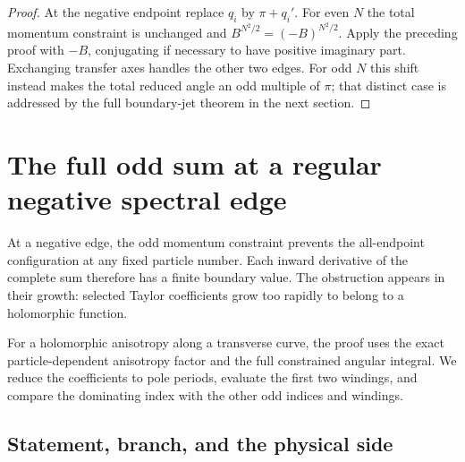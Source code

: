 \documentclass[11pt]{article}
\numberwithin{equation}{section}
\theoremstyle{definition}
\begin{document}
\begin{proof}
At the negative endpoint replace \(q_i\) by \(\pi+q_i'\).
For even \(N\) the total momentum constraint is unchanged and
\(B^{N^2/2}=(-B)^{N^2/2}\). Apply the preceding proof with
\(-B\), conjugating if necessary to have positive imaginary part.
Exchanging transfer axes handles the other two edges.
For odd \(N\) this shift instead makes the total reduced angle
an odd multiple of \(\pi\); that distinct case is addressed by
the full boundary-jet theorem in the next section.
\end{proof}

\section{The full odd sum at a regular negative spectral edge}
\label{neg:section}

At a negative edge, the odd momentum constraint prevents the
all-endpoint configuration at any fixed particle number. Each inward
derivative of the complete sum therefore has a finite boundary value.
The obstruction appears in their growth: selected Taylor coefficients
grow too rapidly to belong to a holomorphic function.

For a holomorphic anisotropy along a transverse curve, the proof
uses the exact particle-dependent anisotropy factor and the full
constrained angular integral. We reduce the coefficients to pole
periods, evaluate the first two windings, and compare the dominating
index with the other odd indices and windings.

\subsection{Statement, branch, and the physical side}
\label{neg:setup}
\end{document}

